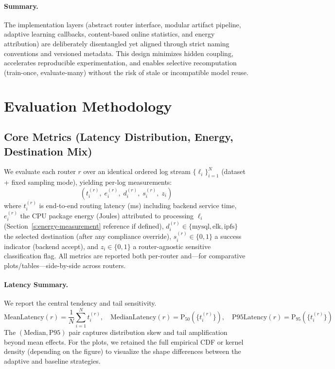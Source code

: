 \paragraph{Summary.}
The implementation layers (abstract router interface, modular artifact pipeline, adaptive learning callbacks, content-based online statistics, and energy attribution) are deliberately disentangled yet aligned through strict naming conventions and versioned metadata. This design minimizes hidden coupling, accelerates reproducible experimentation, and enables selective recomputation (train-once, evaluate-many) without the risk of stale or incompatible model reuse.

\section{Evaluation Methodology}
\label{s:evaluation-methodology}

\subsection{Core Metrics (Latency Distribution, Energy, Destination Mix)}
\label{s:eval-core-metrics}
We evaluate each router $r$ over an identical ordered log stream $\{\ell_i\}_{i=1}^{N}$ (dataset + fixed sampling mode), yielding per-log measurements:
\[
(t_i^{(r)},\; e_i^{(r)},\; d_i^{(r)},\; s_i^{(r)},\; z_i)
\]
where $t_i^{(r)}$ is end-to-end routing latency (ms) including backend service time, $e_i^{(r)}$ the CPU package energy (Joules) attributed to processing $\ell_i$ (Section~\ref{s:energy-measurement} reference if defined), $d_i^{(r)} \in \{\text{mysql},\text{elk},\text{ipfs}\}$ the selected destination (after any compliance override), $s_i^{(r)} \in \{0,1\}$ a success indicator (backend accept), and $z_i \in \{0,1\}$ a router-agnostic sensitive classification flag. All metrics are reported both per-router and---for comparative plots/tables---side-by-side across routers.

\paragraph{Latency Summary.}
We report the central tendency and tail sensitivity.
\[
\text{MeanLatency}(r)=\frac{1}{N}\sum_{i=1}^{N} t_i^{(r)}, \quad
\text{MedianLatency}(r)=\text{P}_{50}(\{t_i^{(r)}\}), \quad
\text{P95Latency}(r)=\text{P}_{95}(\{t_i^{(r)}\})
\]
\noindent The $(\text{Median}, \text{P95})$ pair captures distribution skew and tail amplification beyond mean effects. For the plots, we retained the full empirical CDF or kernel density (depending on the figure) to visualize the shape differences between the adaptive and baseline strategies.

